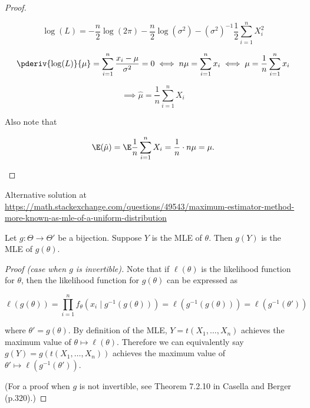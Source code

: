 \begin{proof}
\begin{enumerate}[a.]
\[
\log(L) = -\frac{n}{2} \log(2 \pi) - \frac{n}{2} \log(\sigma^2) - (\sigma^2)^{-1} \frac{1}{2} \sum_{i=1}^n X_i^2
\]

\[
\pderiv{\log(L)}{\mu} = \sum_{i=1}^n \frac{x_i - \mu}{\sigma^2} = 0 \iff n \mu = \sum_{i=1}^n x_i \iff \mu = \frac{1}{n}  \sum_{i=1}^n x_i 
\]


\[
\implies \hat{\mu} = \frac{1}{n} \sum_{i=1}^n X_i
\]

Also note that 

\[
\E( \hat{\mu}) = \E  \frac{1}{n} \sum_{i=1}^n X_i = \frac{1}{n} \cdot n \mu = \mu.
\]

\end{enumerate}

\end{proof}

\begin{example} Alternative solution at \url{https://math.stackexchange.com/questions/49543/maximum-estimator-method-more-known-as-mle-of-a-uniform-distribution}

\end{example}

\begin{proposition}Let \(g:\Theta \to \Theta'\) be a bijection. Suppose \(Y\) is the MLE of \(\theta\). Then \(g(Y)\) is the MLE of \(g(\theta)\).

\end{proposition}

\begin{proof}[Proof (case when \(g\) is invertible)]Note that if \(\ell(\theta)\) is the likelihood function for \(\theta\), then the likelihood function for \(g(\theta)\) can be expressed as 

\[
\ell(g(\theta)) = \prod_{i=1}^n f_\theta(x_i \mid g^{-1}(g(\theta))) = \ell(g^{-1}(g(\theta))) = \ell(g^{-1}(\theta'))
\]

where \(\theta' = g(\theta)\). By definition of the MLE, \(Y = t(X_1, \ldots, X_n)\) achieves the maximum value of \(\theta \mapsto \ell(\theta)\). Therefore we can equivalently say \(g(Y) = g(t(X_1, \ldots, X_n))\) achieves the maximum value of \(\theta' \mapsto \ell(g^{-1}(\theta'))\).

(For a proof when \(g\) is not invertible, see Theorem 7.2.10 in Casella and Berger (p.320).)

\end{proof}

